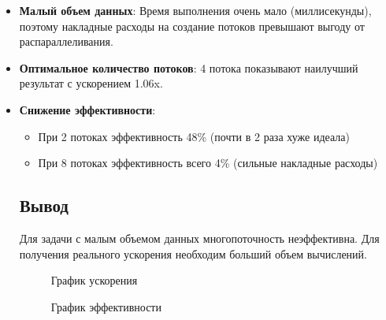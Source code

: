 \documentclass[12pt,a4paper]{article}
\begin{document}
\begin{itemize}
\item \textbf{Малый объем данных}: Время выполнения очень мало (миллисекунды), поэтому накладные расходы на создание потоков превышают выгоду от распараллеливания.

\item \textbf{Оптимальное количество потоков}: 4 потока показывают наилучший результат с ускорением 1.06x.

\item \textbf{Снижение эффективности}:
  \begin{itemize}
  \item При 2 потоках эффективность 48\% (почти в 2 раза хуже идеала)
  \item При 8 потоках эффективность всего 4\% (сильные накладные расходы)
  \end{itemize}

\subsection*{Вывод}
Для задачи с малым объемом данных многопоточность неэффективна. Для получения реального ускорения необходим больший объем вычислений.

\begin{figure}[h]
\centering
\begin{minipage}{0.45\textwidth}
\centering
{}
\caption{График ускорения}
\end{minipage}
\hfill
\begin{minipage}{0.45\textwidth}
\centering
{}
\caption{График эффективности}
\end{minipage}
\end{figure}


\end{itemize}
\end{document}
